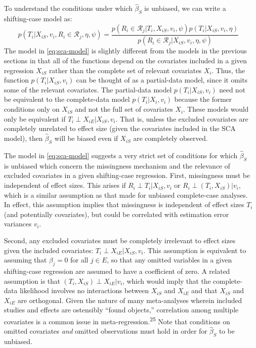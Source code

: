 \documentclass[
]{article}
\begin{document}
To understand the conditions under which \(\hat{\beta}_S\) is unbiased, we can write a shifting-case model as:
\begin{equation}
p(T_{i} | X_{iS}, v_i, R_i \in \mathcal{R}_j, \eta, \psi) = \frac{p(R_i \in \mathcal{R}_j | T_i, X_{iS}, v_i, \psi) p(T_i | X_{iS}, v_i, \eta)}{p(R_i \in \mathcal{R}_j | X_{iS}, v_i, \eta, \psi)}
\label{eq:sca-model}
\end{equation}
The model in \eqref{eq:sca-model} is slightly different from the models in the previous sections in that all of the functions depend on the covariates included in a given regression \(X_{iS}\) rather than the complete set of relevant covariates \(X_i\).
Thus, the function \(p(T_i | X_{iS}, v_i)\) can be thought of as a partial-data model, since it omits some of the relevant covariates.
The partial-data model \(p(T_i | X_{iS}, v_i)\) need not be equivalent to the complete-data model \(p(T_i | X_i, v_i)\) because the former conditions only on \(X_{iS}\) and not the full set of covariates \(X_i\).
These models would only be equivalent if \(T_i \perp X_{iE} | X_{iS}, v_i\).
That is, unless the excluded covariates are completely unrelated to effect size (given the covariates included in the SCA model), then \(\hat{\beta}_S\) will be biased even if \(X_{iS}\) are completely observed.

The model in \eqref{eq:sca-model} suggests a very strict set of conditions for which \(\hat{\beta}_S\) is unbiased which concern the missingness mechanism and the relevance of excluded covariates in a given shifting-case regression.
First, missingness must be independent of effect sizes.
This arises if \(R_i \perp T_i | X_{iS}, v_i\) or \(R_i \perp (T_i, X_{iS}) | v_i\), which is a similar assumption as that made for unbiased complete-case analyses.
In effect, this assumption implies that missingness is independent of effect sizes \(T_i\) (and potentially covariates), but could be correlated with estimation error variances \(v_i\).

Second, any excluded covariates must be completely irrelevant to effect sizes given the included covariates: \(T_i \perp X_{iE} | X_{iS}, v_i\).
This assumption is equivalent to assuming that \(\beta_j = 0\) for all \(j \in E\), so that any omitted variables in a given shifting-case regression are assumed to have a coefficient of zero.
A related assumption is that \((T_i, X_{iS}) \perp X_{iE} | v_i\), which would imply that the complete-data likelihood involves no interactions between \(X_{iS}\) and \(X_{iE}\) and that \(X_{iS}\) and \(X_{iE}\) are orthogonal.
Given the nature of many meta-analyses wherein included studies and effects are ostensibly ``found objects,'' correlation among multiple covariates is a common issue in meta-regression.\textsuperscript{25}
Note that conditions on omitted covariates \emph{and} omitted observations must hold in order for \(\hat{\beta}_S\) to be unbiased.
\end{document}
